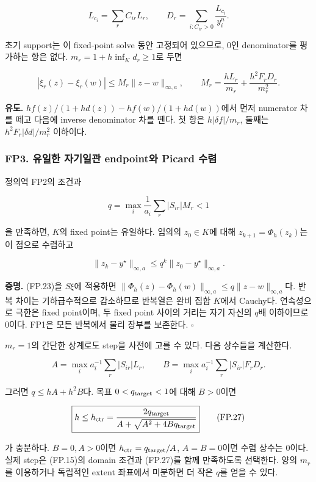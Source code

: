 \documentclass[11pt,a4paper]{article}
\begin{document}
\[
L_{c_i}=\sum_r C_{ir}L_r,\qquad
D_r=\sum_{i:C_{ir}>0}\frac{L_{c_i}}{y_i^n}.
\tag{FP.22}
\]

초기 support는 이 fixed-point solve 동안 고정되어 있으므로, 0인 denominator를 평가하는 항은 없다. \(m_r=1+h\inf_Kd_r\ge1\)로 두면

\[
|\xi_r(z)-\xi_r(w)|
\le
M_r\|z-w\|_{\infty,a},
\qquad
M_r=\frac{hL_r}{m_r}
+\frac{h^2F_rD_r}{m_r^2}.
\tag{FP.23}
\]

\textbf{유도.} \(h f(z)/(1+hd(z))-h f(w)/(1+hd(w))\)에서 먼저 numerator 차를 떼고 다음에 inverse denominator 차를 뗀다. 첫 항은 \(h|\delta f|/m_r\), 둘째는 \(h^2F_r|\delta d|/m_r^2\) 이하이다.

\hypertarget{fp3.-uxc720uxc77cuxd55c-uxc790uxae30uxc77cuxad00-endpointuxc640-picard-uxc218uxb834}{%
\subsubsection{FP3. 유일한 자기일관 endpoint와 Picard 수렴}\label{fp3.-uxc720uxc77cuxd55c-uxc790uxae30uxc77cuxad00-endpointuxc640-picard-uxc218uxb834}}

정의역 FP2의 조건과

\[
\boxed{
q=\max_i\frac1{a_i}\sum_r|S_{ir}|M_r<1
}
\tag{FP.24}
\]

을 만족하면, \(K\)의 fixed point는 유일하다. 임의의 \(z_0\in K\)에 대해 \(z_{k+1}=\Phi_h(z_k)\)는 이 점으로 수렴하고

\[
\|z_k-y^\star\|_{\infty,a}
\le q^k\|z_0-y^\star\|_{\infty,a}.
\tag{FP.25}
\]

\textbf{증명.} (FP.23)을 \(S\xi\)에 적용하면 \(\|\Phi_h(z)-\Phi_h(w)\|_{\infty,a}\le q\|z-w\|_{\infty,a}\)다. 반복 차이는 기하급수적으로 감소하므로 반복열은 완비 집합 \(K\)에서 Cauchy다. 연속성으로 극한은 fixed point이며, 두 fixed point 사이의 거리는 자기 자신의 \(q\)배 이하이므로 0이다. FP1은 모든 반복에서 물리 장부를 보존한다. \(\square\)

\(m_r=1\)의 간단한 상계로도 step을 사전에 고를 수 있다. 다음 상수들을 계산한다.

\[
A=\max_i a_i^{-1}\sum_r|S_{ir}|L_r,\qquad
B=\max_i a_i^{-1}\sum_r|S_{ir}|F_rD_r.
\tag{FP.26}
\]

그러면 \(q\le hA+h^2B\)다. 목표 \(0<q_{\rm target}<1\)에 대해 \(B>0\)이면

\[
\boxed{
h\le h_{\rm ctr}
=\frac{2q_{\rm target}}
{A+\sqrt{A^2+4Bq_{\rm target}}}
}
\tag{FP.27}
\]

가 충분하다. \(B=0,A>0\)이면 \(h_{\rm ctr}=q_{\rm target}/A\), \(A=B=0\)이면 수렴 상수는 0이다. 실제 step은 (FP.15)의 domain 조건과 (FP.27)를 함께 만족하도록 선택한다. 양의 \(m_r\)를 이용하거나 독립적인 extent 좌표에서 미분하면 더 작은 \(q\)를 얻을 수 있다.
\end{document}
